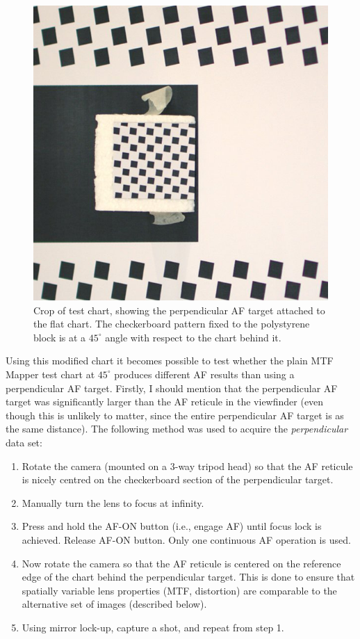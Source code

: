 \documentclass[a4paper]{article}
\begin{document}
\begin{figure}
  \centering
  \includegraphics{figures/perpendicular_target}
  \caption{Crop of test chart, showing the perpendicular AF target attached
to the flat chart. The checkerboard pattern fixed to the polystyrene block
is at a $45^\circ$ angle with respect to the chart behind it.}
  \label{fig:perpendicular_target}
\end{figure}

Using this modified chart it becomes possible to test whether the plain MTF
Mapper test chart at $45^\circ$ produces different AF results than using a
perpendicular AF target. Firstly, I should mention that the perpendicular AF
target was significantly larger than the AF reticule in the viewfinder (even
though this is unlikely to matter, since the entire perpendicular AF target
is as the same distance). The following method was used to acquire the
\emph{perpendicular} data set:

\begin{enumerate}
  \item Rotate the camera (mounted on a 3-way tripod head) so that the AF
reticule is nicely centred on the checkerboard section of the perpendicular
target.
  \item Manually turn the lens to focus at infinity.
  \item Press and hold the AF-ON button (i.e., engage AF) until focus lock
  is achieved. Release AF-ON button. Only one continuous AF operation is used.
  \item Now rotate the camera so that the AF reticule is centered on the
  reference edge of the chart behind the perpendicular target. This is done
  to ensure that spatially variable lens properties (MTF, distortion) are
  comparable to the alternative set of images (described below).
  \item Using mirror lock-up, capture a shot, and repeat from step 1.
\end{enumerate}
\end{document}
